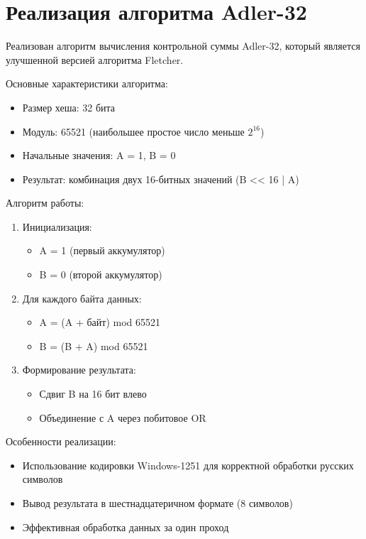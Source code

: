 \documentclass[a4paper, 14pt]{extarticle}
\begin{document}
\section{Реализация алгоритма Adler-32}
Реализован алгоритм вычисления контрольной суммы Adler-32, который является улучшенной версией алгоритма Fletcher.

Основные характеристики алгоритма:
\begin{itemize}
    \item Размер хеша: 32 бита
    \item Модуль: 65521 (наибольшее простое число меньше \(2^{16}\))
    \item Начальные значения: A = 1, B = 0
    \item Результат: комбинация двух 16-битных значений (B << 16 | A)
\end{itemize}

Алгоритм работы:
\begin{enumerate}
    \item Инициализация:
    \begin{itemize}
        \item A = 1 (первый аккумулятор)
        \item B = 0 (второй аккумулятор)
    \end{itemize}
    \item Для каждого байта данных:
    \begin{itemize}
        \item A = (A + байт) mod 65521
        \item B = (B + A) mod 65521
    \end{itemize}
    \item Формирование результата:
    \begin{itemize}
        \item Сдвиг B на 16 бит влево
        \item Объединение с A через побитовое OR
    \end{itemize}
\end{enumerate}

Особенности реализации:
\begin{itemize}
    \item Использование кодировки Windows-1251 для корректной обработки русских символов
    \item Вывод результата в шестнадцатеричном формате (8 символов)
    \item Эффективная обработка данных за один проход
\end{itemize}
\end{document}
